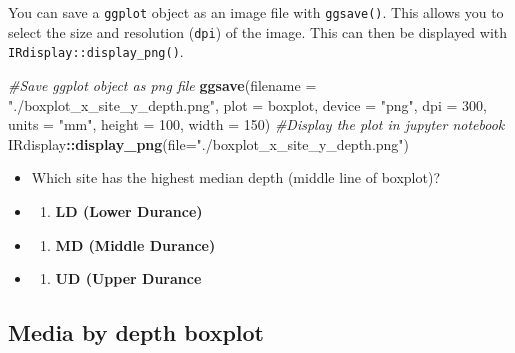 \documentclass[
]{book}
\newenvironment{Shaded}{\begin{snugshade}}{\end{snugshade}}
\newcommand{\AttributeTok}[1]{\textcolor[rgb]{0.13,0.29,0.53}{#1}}
\newcommand{\CommentTok}[1]{\textcolor[rgb]{0.56,0.35,0.01}{\textit{#1}}}
\newcommand{\DecValTok}[1]{\textcolor[rgb]{0.00,0.00,0.81}{#1}}
\newcommand{\FunctionTok}[1]{\textcolor[rgb]{0.13,0.29,0.53}{\textbf{#1}}}
\newcommand{\NormalTok}[1]{#1}
\newcommand{\SpecialCharTok}[1]{\textcolor[rgb]{0.81,0.36,0.00}{\textbf{#1}}}
\newcommand{\StringTok}[1]{\textcolor[rgb]{0.31,0.60,0.02}{#1}}
\providecommand{\tightlist}{%
  \setlength{\itemsep}{0pt}\setlength{\parskip}{0pt}}
\begin{document}
You can save a \texttt{ggplot} object as an image file with \texttt{ggsave()}.
This allows you to select the size and resolution (\texttt{dpi}) of the image.
This can then be displayed with \texttt{IRdisplay::display\_png()}.

\begin{Shaded}
\begin{Highlighting}[]
\CommentTok{\#Save ggplot object as png file}
\FunctionTok{ggsave}\NormalTok{(}\AttributeTok{filename =} \StringTok{"./boxplot\_x\_site\_y\_depth.png"}\NormalTok{, }\AttributeTok{plot =}\NormalTok{ boxplot,}
       \AttributeTok{device =} \StringTok{"png"}\NormalTok{, }\AttributeTok{dpi =} \DecValTok{300}\NormalTok{, }\AttributeTok{units =} \StringTok{"mm"}\NormalTok{, }\AttributeTok{height =} \DecValTok{100}\NormalTok{, }\AttributeTok{width =} \DecValTok{150}\NormalTok{)}
\CommentTok{\#Display the plot in jupyter notebook}
\NormalTok{IRdisplay}\SpecialCharTok{::}\FunctionTok{display\_png}\NormalTok{(}\AttributeTok{file=}\StringTok{"./boxplot\_x\_site\_y\_depth.png"}\NormalTok{)}
\end{Highlighting}
\end{Shaded}

\begin{itemize}
\item
  Which site has the highest median depth (middle line of boxplot)?
\item
  \begin{enumerate}
  \def\labelenumi{(\Alph{enumi})}
  \tightlist
  \item
    \textbf{LD (Lower Durance)}\\
  \end{enumerate}
\item
  \begin{enumerate}
  \def\labelenumi{(\Alph{enumi})}
  \setcounter{enumi}{1}
  \tightlist
  \item
    \textbf{MD (Middle Durance)}\\
  \end{enumerate}
\item
  \begin{enumerate}
  \def\labelenumi{(\Alph{enumi})}
  \setcounter{enumi}{2}
  \tightlist
  \item
    \textbf{UD (Upper Durance}
  \end{enumerate}
\end{itemize}

\hypertarget{media-by-depth-boxplot}{%
\subsection{Media by depth boxplot}\label{media-by-depth-boxplot}}
\end{document}
